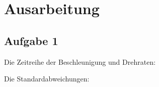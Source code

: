 \chapter{Ausarbeitung}
\section{Aufgabe 1}
Die Zeitreihe der Beschleunigung und Drehraten:\\
\begin{figure}[htpb]\centering
\end{figure}
\clearpage
\begin{figure}[htpb]\centering
\end{figure}
Die Standardabweichungen:
